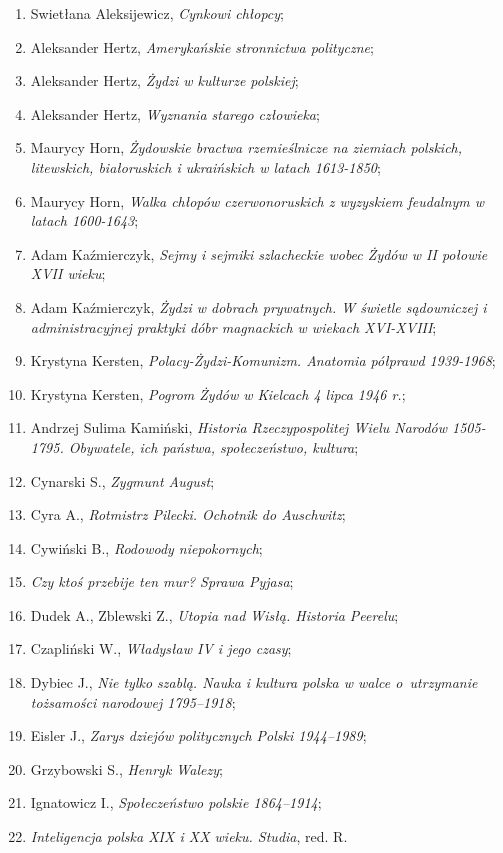 \documentclass[a4paper,11pt]{article}
\begin{document}
\begin{enumerate}
\item Swietłana Aleksijewicz, \emph{Cynkowi chłopcy};
\item Aleksander Hertz, \emph{Amerykańskie stronnictwa polityczne};
\item Aleksander Hertz, \emph{Żydzi w kulturze polskiej};
\item Aleksander Hertz, \emph{Wyznania starego człowieka};
\item Maurycy Horn, \emph{Żydowskie bractwa rzemieślnicze na ziemiach
    polskich, litewskich, białoruskich i ukraińskich w latach
    1613-1850};
\item Maurycy Horn, \emph{Walka chłopów czerwonoruskich z wyzyskiem
    feudalnym w latach 1600-1643};
\item Adam Kaźmierczyk, \emph{Sejmy i sejmiki szlacheckie wobec Żydów
    w II połowie XVII wieku};
\item Adam Kaźmierczyk, \emph{Żydzi w dobrach prywatnych. W świetle
    sądowniczej i administracyjnej praktyki dóbr magnackich w wiekach
    XVI-XVIII};
\item Krystyna Kersten, \emph{Polacy-Żydzi-Komunizm. Anatomia półprawd
    1939-1968};
\item Krystyna Kersten, \emph{Pogrom Żydów w Kielcach 4 lipca 1946
    r.};
\item Andrzej Sulima Kamiński, \emph{Historia Rzeczypospolitej Wielu
    Narodów 1505-1795. Obywatele, ich państwa, społeczeństwo,
    kultura};
\item Cynarski S., \emph{Zygmunt August};
\item Cyra A., \emph{Rotmistrz Pilecki. Ochotnik do Auschwitz};
\item Cywiński B., \emph{Rodowody niepokornych};
\item \emph{Czy ktoś przebije ten mur? Sprawa Pyjasa};
\item Dudek A., Zblewski Z., \emph{Utopia nad Wisłą. Historia
    Peerelu};
\item Czapliński W., \emph{Władysław IV i jego czasy};
\item Dybiec J., \emph{Nie tylko szablą. Nauka i kultura polska w
    walce o~utrzymanie tożsamości narodowej 1795--1918};
\item Eisler J., \emph{Zarys dziejów politycznych Polski 1944--1989};
\item Grzybowski S., \emph{Henryk Walezy};
\item Ignatowicz I., \emph{Społeczeństwo polskie 1864--1914};
\item \emph{Inteligencja polska XIX i XX wieku. Studia}, red. R.

\end{enumerate}
\end{document}
